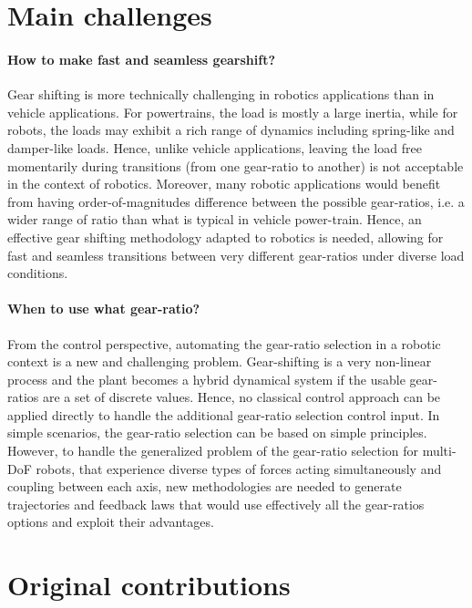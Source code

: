 \section{Main challenges}
\label{sec:MainChallenges}

\paragraph{How to make fast and seamless gearshift?}
Gear shifting is more technically challenging in robotics applications than in vehicle applications. For powertrains, the load is mostly a large inertia, while for robots, the loads may exhibit a rich range of dynamics including spring-like and damper-like loads. Hence, unlike vehicle applications, leaving the load free momentarily during transitions (from one gear-ratio to another) is not acceptable in the context of robotics. Moreover, many robotic applications would benefit from having order-of-magnitudes difference between the possible gear-ratios, i.e. a wider range of ratio than what is typical in vehicle power-train. Hence, an effective gear shifting methodology adapted to robotics is needed, allowing for fast and seamless transitions between very different gear-ratios under diverse load conditions.

\paragraph{When to use what gear-ratio?}
From the control perspective, automating the gear-ratio selection in a robotic context is a new and challenging problem. Gear-shifting is a very non-linear process and the plant becomes a hybrid dynamical system if the usable gear-ratios are a set of discrete values. Hence, no classical control approach can be applied directly to handle the additional gear-ratio selection control input. In simple scenarios, the gear-ratio selection can be based on simple principles. However, to handle the generalized problem of the gear-ratio selection for multi-DoF robots, that experience diverse types of forces acting simultaneously and coupling between each axis, new methodologies are needed to generate trajectories and feedback laws that would use effectively all the gear-ratios options and exploit their advantages.


\newpage

\section{Original contributions}
\label{sec:contribution}

